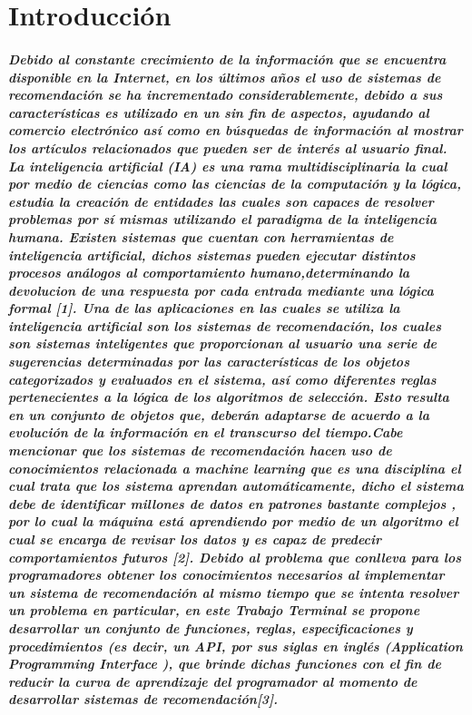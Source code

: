 \chapter{Introducción}
	\paragraph{Debido al constante crecimiento de la información que se encuentra disponible en la Internet, en los últimos años el uso de sistemas de recomendación se ha incrementado considerablemente, debido a sus características es utilizado en un sin fin de aspectos, ayudando al comercio electrónico así como en búsquedas de información al mostrar los artículos relacionados que pueden ser de interés al usuario final. La inteligencia artificial (IA) es una rama multidisciplinaria la cual por medio de ciencias como las ciencias de la computación y la lógica, estudia la creación de entidades las cuales son capaces de resolver problemas por sí mismas utilizando el paradigma de la inteligencia humana. Existen sistemas que cuentan con herramientas de inteligencia artificial, dichos sistemas pueden ejecutar distintos procesos análogos al comportamiento humano,determinando la devolucion de una respuesta por cada entrada mediante una lógica formal [1]. Una de las aplicaciones en las cuales se utiliza la inteligencia artificial son los sistemas de recomendación, los cuales son sistemas inteligentes que proporcionan al usuario una serie de sugerencias determinadas por las características de los objetos categorizados y evaluados en el sistema, así como diferentes reglas pertenecientes a la lógica de los algoritmos de selección. Esto resulta en un conjunto de objetos que, deberán adaptarse de acuerdo a la evolución de la información en el transcurso del tiempo.Cabe mencionar que los sistemas de recomendación hacen uso de conocimientos relacionada a machine learning que es una disciplina el cual trata que los sistema aprendan automáticamente, dicho el sistema debe de identificar millones de datos en patrones bastante complejos , por lo cual la máquina está aprendiendo por medio de un algoritmo el cual se encarga de revisar los datos y es capaz de predecir comportamientos futuros [2]. Debido al problema que conlleva para los programadores obtener los conocimientos necesarios al implementar un sistema de recomendación al mismo tiempo que se intenta resolver un problema en particular, en este Trabajo Terminal se propone desarrollar un conjunto de funciones, reglas, especificaciones y procedimientos (es decir, un API, por sus siglas en inglés (Application Programming Interface ), que brinde dichas funciones con el fin de reducir la curva de aprendizaje del programador al momento de desarrollar sistemas de recomendación[3].}